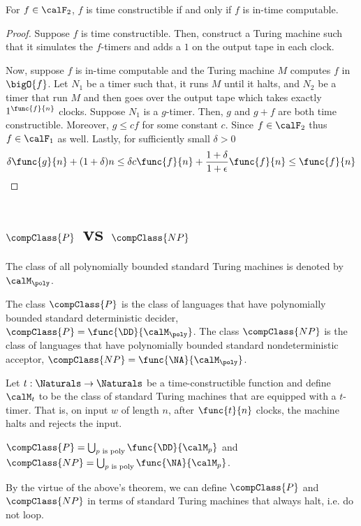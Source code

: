 \begin{theorem}
    For \(f \in \calF_2\), \(f\) is time constructible if and only if \(f\) is in-time computable.
\end{theorem}

\begin{proof}
    Suppose \(f\) is time constructible. Then, construct a Turing machine such that it simulates the \(f\)-timers and adds a \(1\) on the output tape in each clock. 

    Now, suppose \(f\) is in-time computable and the Turing machine \(M\) computes \(f\) in \(\bigO{f}\). Let \(N_1\) be a timer such that, it runs \(M\) until it halts, and \(N_2\) be a timer that run \(M\) and then goes over the output tape which takes exactly \(1^{\func{f}{n}}\) clocks. Suppose \(N_1\) is a \(g\)-timer. Then, \(g\) and \(g + f\) are both time constructible. Moreover, \(g \leq c f\) for some constant \(c\). Since \(f \in \calF_2\) thus \(f \in \calF_1\) as well. Lastly, for sufficiently small \(\delta > 0\)
    \begin{equation*}
        \delta \func{g}{n} + (1+\delta) n \leq \delta c \func{f}{n} + \dfrac{1+\delta}{1 + \epsilon} \func{f}{n} \leq \func{f}{n}
    \end{equation*}
\end{proof}

\section{\(\compClass{P}\) vs \(\compClass{NP}\)}
\begin{definition}
    The class of all polynomially bounded standard Turing machines is denoted by \(\calM_{\poly}\).
\end{definition}

\begin{definition}
    The class \(\compClass{P}\) is the class of languages that have polynomially bounded standard deterministic decider, \(\compClass{P} = \func{\DD}{\calM_{\poly}}\). The class \(\compClass{NP}\) is the class of languages that have polynomially bounded standard nondeterministic acceptor, \(\compClass{NP} = \func{\NA}{\calM_{\poly}}\). 
\end{definition}

Let \(t: \Naturals \to \Naturals\) be a time-constructible function and define \(\calM_t\) to be the class of standard Turing machines that are equipped with a \(t\)-timer. That is, on input \(w\) of length \(n\), after \(\func{t}{n}\) clocks, the machine halts and rejects the input. 

\begin{theorem}
    \(\compClass{P} = \bigcup_{p \text{ is poly}} \func{\DD}{\calM_p}\) and  \(\compClass{NP} = \bigcup_{p \text{ is poly}} \func{\NA}{\calM_p}\).
\end{theorem}

By the virtue of the above's theorem, we can define \(\compClass{P}\) and \(\compClass{NP}\) in terms of standard Turing machines that always halt, i.e. do not loop.